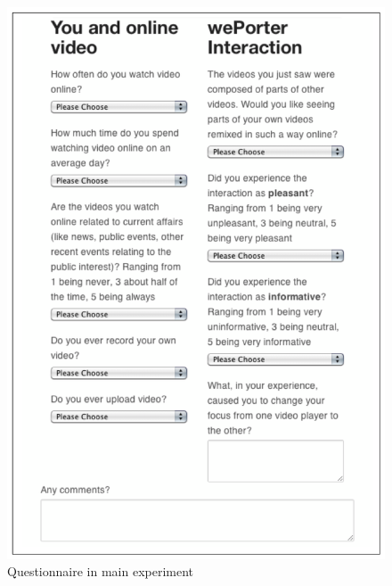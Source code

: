 \appendix

\begin{figure}[htbp]
  \centering
    \includegraphics[scale=1]{img/questionnaire_appendix}
  \caption{Questionnaire in main experiment}
  \label{fig:questionnaire}
\end{figure}